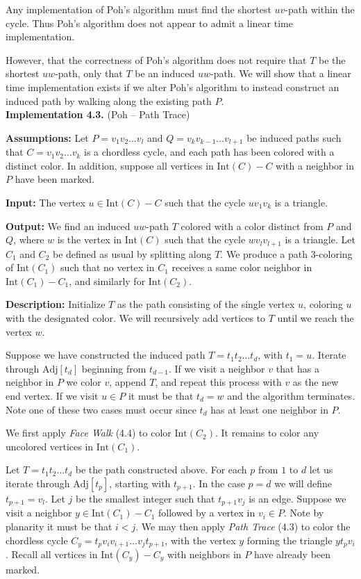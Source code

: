 \documentclass[letterpaper, 12pt]{amsart}
\theoremstyle{definition}
\theoremstyle{definition}
\theoremstyle{thm}
\theoremstyle{definition}
\begin{document}
Any implementation of Poh's algorithm must find the shortest $uv$-path
within the cycle.
Thus Poh's algorithm does not appear to admit a linear time implementation.

However, that the correctness of Poh's algorithm does not require that $T$
be the shortest $uw$-path, only that $T$ be an induced $uw$-path. We will show that a
linear time implementation exists if we alter Poh's algorithm to instead construct
an induced path by walking along the existing path $P$.\\

\noindent\textbf{Implementation 4.3.} (Poh -- Path Trace)

\noindent\textbf{Assumptions:} Let $P=v_1v_2\ldots v_l$ and
$Q=v_kv_{k-1}\ldots v_{l+1}$ be induced paths such that $C=v_1v_2\ldots v_k$ is
a chordless cycle, and each path has been colored with a distinct color. In
addition, suppose all vertices in $\text{Int}(C)- C$ with a neighbor in $P$
have been marked.

\noindent\textbf{Input:} The vertex $u\in \text{Int}(C)-C$ such that the cycle
$uv_1v_k$ is a triangle.

\noindent\textbf{Output:} We find an induced $uw$-path $T$ colored with a color distinct
from $P$ and $Q$, where $w$ is the vertex in $\text{Int}(C)$ such that the cycle
$wv_lv_{l+1}$ is a triangle.
Let $C_1$ and $C_2$ be defined as usual by splitting along $T$.
We produce a path $3$-coloring of $\text{Int}(C_1)$ such that
no vertex in $C_1$ receives a same color neighbor in $\text{Int}(C_1)-C_1$,
and similarly for $\text{Int}(C_2)$.

\noindent\textbf{Description:} Initialize $T$ as the path consisting of the
single vertex $u$, coloring $u$ with the designated color. We will recursively
add vertices to $T$ until we reach the vertex $w$.

Suppose we have constructed the induced path $T=t_1t_2\ldots t_d$, with $t_1=u$.
Iterate through $\text{Adj}[t_d]$
beginning from $t_{d-1}$. If we visit a neighbor $v$ that has a neighbor in
$P$ we color $v$, append $T$, and repeat this process with $v$ as the new
end vertex. If we visit $u\in P$ it must be that $t_d=w$ and
the algorithm terminates. Note one of these two cases must occur since $t_d$
has at least one neighbor in $P$.

We first apply \textit{Face Walk} (4.4) to color $\text{Int}(C_2)$. It remains
to color any uncolored vertices in $\text{Int}(C_1)$.

Let $T=t_1t_2\ldots t_d$ be the path constructed above.
For each $p$ from $1$ to $d$ let us iterate through
$\text{Adj}[t_p]$, starting with $t_{p+1}$. In the case $p=d$ we will define
$t_{p+1}=v_l$. Let $j$ be the smallest integer such that $t_{p+1}v_j$ is an edge. Suppose
we visit a neighbor $y\in \text{Int}(C_1)-C_1$ followed by a vertex in $v_i\in P$.
Note by planarity it must be that $i<j$.
We may then apply \textit{Path Trace} (4.3) to color the chordless cycle
$C_y=t_pv_iv_{i+1}\ldots v_jt_{p+1}$, with the vertex $y$ forming the triangle $yt_pv_i$.
Recall all vertices in $\text{Int}(C_y)-C_y$ with neighbors in $P$ have already been
marked.\\
\end{document}
